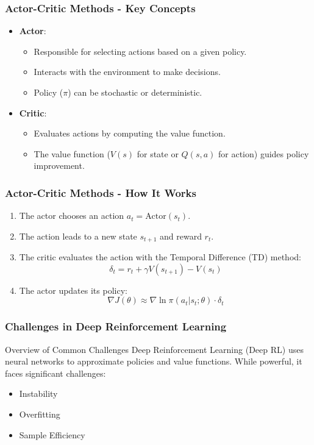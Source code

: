 \documentclass[aspectratio=169]{beamer}
\begin{document}
\begin{frame}[fragile]
    \frametitle{Actor-Critic Methods - Key Concepts}
    \begin{itemize}
        \item \textbf{Actor}:
        \begin{itemize}
            \item Responsible for selecting actions based on a given policy.
            \item Interacts with the environment to make decisions.
            \item Policy ($\pi$) can be stochastic or deterministic.
        \end{itemize}
        
        \item \textbf{Critic}:
        \begin{itemize}
            \item Evaluates actions by computing the value function.
            \item The value function ($V(s)$ for state or $Q(s, a)$ for action) guides policy improvement.
        \end{itemize}
    \end{itemize}
\end{frame}

\begin{frame}[fragile]
    \frametitle{Actor-Critic Methods - How It Works}
    \begin{enumerate}
        \item The actor chooses an action $a_t = \text{Actor}(s_t)$.
        \item The action leads to a new state $s_{t+1}$ and reward $r_t$.
        \item The critic evaluates the action with the Temporal Difference (TD) method:
        \begin{equation}
            \delta_t = r_t + \gamma V(s_{t+1}) - V(s_t)
        \end{equation}
        \item The actor updates its policy:
        \begin{equation}
            \nabla J(\theta) \approx \nabla \ln \pi(a_t | s_t; \theta) \cdot \delta_t
        \end{equation}
    \end{enumerate}
\end{frame}

\begin{frame}[fragile]
  \frametitle{Challenges in Deep Reinforcement Learning}
  \begin{block}{Overview of Common Challenges}
    Deep Reinforcement Learning (Deep RL) uses neural networks to approximate policies and value functions. While powerful, it faces significant challenges:
  \end{block}
  \begin{itemize}
    \item Instability
    \item Overfitting
    \item Sample Efficiency
  \end{itemize}
\end{frame}
\end{document}
